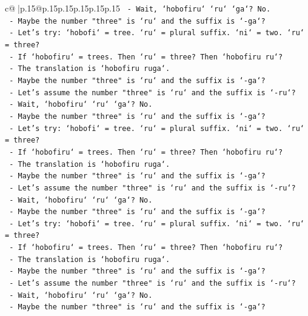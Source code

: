 \documentclass{article}
\begin{document}
{\begin{supertabular}{c@{$\;$}|p{.15\linewidth}@{}p{.15\linewidth}p{.15\linewidth}p{.15\linewidth}p{.15\linewidth}p{.15\linewidth}}
{{{\texttt{    {-} Wait, `hobofiru` `ru` `ga`? No.} \\
\texttt{    {-} Maybe the number "three" is `ru` and the suffix is `{-}ga`?} \\
\texttt{    {-} Let's try: `hobofi` = tree. `ru` = plural suffix. `ni` = two. `ru` = three?} \\
\texttt{    {-} If `hobofiru` = trees. Then `ru` = three? Then `hobofiru ru`?} \\
\texttt{    {-} The translation is `hobofiru ruga`.} \\
\texttt{    {-} Maybe the number "three" is `ru` and the suffix is `{-}ga`?} \\
\texttt{    {-} Let's assume the number "three" is `ru` and the suffix is `{-}ru`?} \\
\texttt{    {-} Wait, `hobofiru` `ru` `ga`? No.} \\
\texttt{    {-} Maybe the number "three" is `ru` and the suffix is `{-}ga`?} \\
\texttt{    {-} Let's try: `hobofi` = tree. `ru` = plural suffix. `ni` = two. `ru` = three?} \\
\texttt{    {-} If `hobofiru` = trees. Then `ru` = three? Then `hobofiru ru`?} \\
\texttt{    {-} The translation is `hobofiru ruga`.} \\
\texttt{    {-} Maybe the number "three" is `ru` and the suffix is `{-}ga`?} \\
\texttt{    {-} Let's assume the number "three" is `ru` and the suffix is `{-}ru`?} \\
\texttt{    {-} Wait, `hobofiru` `ru` `ga`? No.} \\
\texttt{    {-} Maybe the number "three" is `ru` and the suffix is `{-}ga`?} \\
\texttt{    {-} Let's try: `hobofi` = tree. `ru` = plural suffix. `ni` = two. `ru` = three?} \\
\texttt{    {-} If `hobofiru` = trees. Then `ru` = three? Then `hobofiru ru`?} \\
\texttt{    {-} The translation is `hobofiru ruga`.} \\
\texttt{    {-} Maybe the number "three" is `ru` and the suffix is `{-}ga`?} \\
\texttt{    {-} Let's assume the number "three" is `ru` and the suffix is `{-}ru`?} \\
\texttt{    {-} Wait, `hobofiru` `ru` `ga`? No.} \\
\texttt{    {-} Maybe the number "three" is `ru` and the suffix is `{-}ga`?} \\
}}}
\end{supertabular}}
\end{document}
